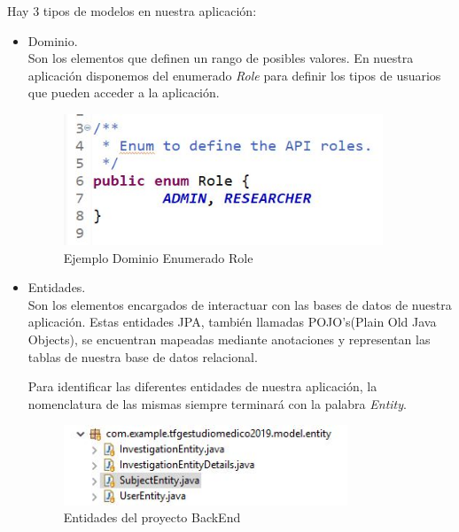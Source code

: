\begin{itemize}
            Hay 3 tipos de modelos en nuestra aplicación:
            \begin{itemize}
                \item Dominio. \\
                Son los elementos que definen un rango de posibles valores. En nuestra aplicación disponemos del enumerado  \textit{Role} para definir los tipos de usuarios que pueden acceder a la aplicación.
                \newline
                
                 \begin{figure}[h]
                \centering
                \includegraphics[width=0.9\textwidth]{images/role.JPG}
                \caption{Ejemplo Dominio Enumerado Role}
                \end{figure}
                
              
                \item Entidades.  \\
                Son los elementos encargados de interactuar con las bases de datos de nuestra aplicación. Estas entidades JPA, también llamadas POJO's(Plain Old Java Objects), se encuentran mapeadas mediante anotaciones y representan las tablas de nuestra base de datos relacional.
                \newline
                
                
            Para identificar las diferentes entidades de nuestra aplicación, la nomenclatura de las mismas siempre terminará con la palabra \textit{Entity}.
            \newline
                
                  \begin{figure}[h]
                        \centering
                        \includegraphics[width=0.8\textwidth]{images/entity.JPG}
                        \caption{Entidades del proyecto BackEnd}
                    \end{figure}
            

\end{itemize}
\end{itemize}

